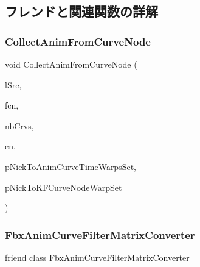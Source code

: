 \subsection{フレンドと関連関数の詳解}
\mbox{\label{class_fbx_anim_curve_node_a54d20e7508453ca014d08b85da892621}} 
\subsubsection{\texorpdfstring{Collect\+Anim\+From\+Curve\+Node}{CollectAnimFromCurveNode}}
{\footnotesize\ttfamily void Collect\+Anim\+From\+Curve\+Node (\begin{DoxyParamCaption}\item[{void $\ast$$\ast$}]{l\+Src,  }\item[{void $\ast$}]{fcn,  }\item[{unsigned int}]{nb\+Crvs,  }\item[{\hyperlink{class_fbx_anim_curve_node}{Fbx\+Anim\+Curve\+Node} $\ast$}]{cn,  }\item[{\hyperlink{class_fbx_multi_map}{Fbx\+Multi\+Map} $\ast$}]{p\+Nick\+To\+Anim\+Curve\+Time\+Warps\+Set,  }\item[{\hyperlink{class_fbx_multi_map}{Fbx\+Multi\+Map} \&}]{p\+Nick\+To\+K\+F\+Curve\+Node\+Warp\+Set }\end{DoxyParamCaption})\hspace{0.3cm}{\ttfamily [friend]}}

\mbox{\label{class_fbx_anim_curve_node_a0e66be27522fe93db7ee48dbdb4420bb}} 
\subsubsection{\texorpdfstring{Fbx\+Anim\+Curve\+Filter\+Matrix\+Converter}{FbxAnimCurveFilterMatrixConverter}}
{\footnotesize\ttfamily friend class \hyperlink{class_fbx_anim_curve_filter_matrix_converter}{Fbx\+Anim\+Curve\+Filter\+Matrix\+Converter}\hspace{0.3cm}{\ttfamily [friend]}}

